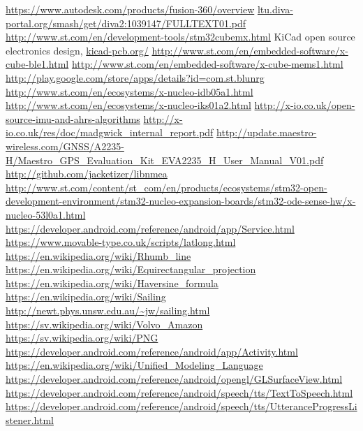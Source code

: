 \begin{thebibliography}{99}
\label{sec:ref}

	\url{https://www.autodesk.com/products/fusion-360/overview}
	\url{ltu.diva-portal.org/smash/get/diva2:1039147/FULLTEXT01.pdf}
	\url{http://www.st.com/en/development-tools/stm32cubemx.html}
	KiCad open source electronics design,
	\url{kicad-pcb.org/}
	\url{http://www.st.com/en/embedded-software/x-cube-ble1.html}
	\url{http://www.st.com/en/embedded-software/x-cube-mems1.html}
	\url{http://play.google.com/store/apps/details?id=com.st.blunrg}
	\url{http://www.st.com/en/ecosystems/x-nucleo-idb05a1.html}
	\url{http://www.st.com/en/ecosystems/x-nucleo-iks01a2.html}
	\url{http://x-io.co.uk/open-source-imu-and-ahrs-algorithms}
	\url{http://x-io.co.uk/res/doc/madgwick_internal_report.pdf}
	\url{http://update.maestro-wireless.com/GNSS/A2235-H/Maestro_GPS_Evaluation_Kit_EVA2235_H_User_Manual_V01.pdf}
	\url{http://github.com/jacketizer/libnmea}
	\url{http://www.st.com/content/st_com/en/products/ecosystems/stm32-open-development-environment/stm32-nucleo-expansion-boards/stm32-ode-sense-hw/x-nucleo-53l0a1.html}
	\url{https://developer.android.com/reference/android/app/Service.html}
	\url{https://www.movable-type.co.uk/scripts/latlong.html}
	\url{https://en.wikipedia.org/wiki/Rhumb_line}
	\url{https://en.wikipedia.org/wiki/Equirectangular_projection}
	\url{https://en.wikipedia.org/wiki/Haversine_formula}
	\url{https://en.wikipedia.org/wiki/Sailing}
	\url{http://newt.phys.unsw.edu.au/~jw/sailing.html}
	\url{https://sv.wikipedia.org/wiki/Volvo_Amazon}
	\url{https://sv.wikipedia.org/wiki/PNG}
	\url{https://developer.android.com/reference/android/app/Activity.html}
	\url{https://en.wikipedia.org/wiki/Unified_Modeling_Language}
	\url{https://developer.android.com/reference/android/opengl/GLSurfaceView.html}
	\url{https://developer.android.com/reference/android/speech/tts/TextToSpeech.html}
	\url{https://developer.android.com/reference/android/speech/tts/UtteranceProgressListener.html}

\end{thebibliography}
